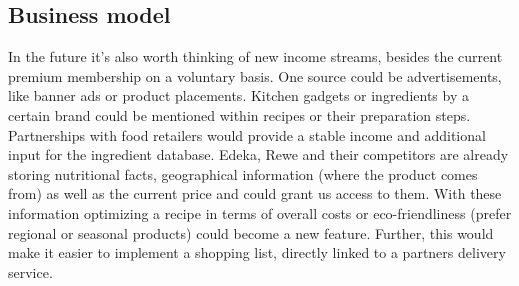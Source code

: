 \subsection{Business model}
In the future it’s also worth thinking of new income streams, besides the current premium membership on a voluntary basis. One source could be advertisements, like banner ads or product placements. Kitchen gadgets or ingredients by a certain brand could be mentioned within recipes or their preparation steps. 
Partnerships with food retailers would provide a stable income and additional input for the ingredient database. Edeka, Rewe and their competitors are already storing nutritional facts, geographical information (where the product comes from) as well as the current price and could grant us access to them. With these information optimizing a recipe in terms of overall costs or eco-friendliness (prefer regional or seasonal products) could become a new feature. 
Further, this would make it easier to implement a shopping list, directly linked to a partners delivery service.